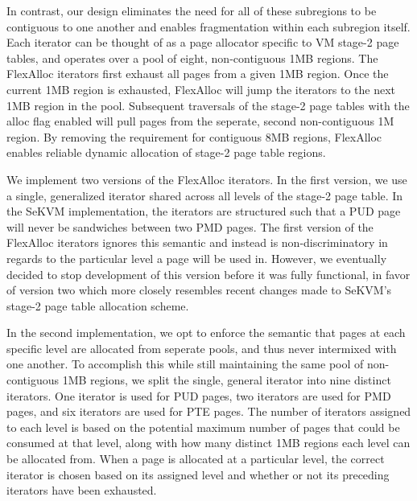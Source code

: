 In contrast, our design eliminates the need for all of these subregions to be contiguous to
one another and enables fragmentation within each subregion itself. Each iterator can be thought of as a page allocator specific to VM stage-2
page tables, and operates over a pool of eight, non-contiguous 1MB regions. The FlexAlloc iterators
first exhaust all pages from a given 1MB region. Once the current 1MB region is exhausted, FlexAlloc
will jump the iterators to the next 1MB region in the pool. Subsequent traversals of the
stage-2 page tables with the alloc flag enabled will pull pages from the seperate, second
non-contiguous 1M region. By removing the requirement for contiguous 8MB regions, FlexAlloc
enables reliable dynamic allocation of stage-2 page table regions.

We implement two versions of the FlexAlloc iterators. In the first version, we use a single,
generalized iterator shared across all levels of the stage-2 page table. In the SeKVM implementation,
the iterators are structured such that a PUD page will never be sandwiches between two PMD pages.
The first version of the FlexAlloc iterators ignores this semantic and instead is non-discriminatory
in regards to the particular level a page will be used in. However, we eventually decided to stop development of this
version before it was fully functional, in favor of version two which more closely resembles recent changes made to SeKVM's
stage-2 page table allocation scheme.

In the second implementation, we opt to enforce the semantic that pages at each specific level are
allocated from seperate pools, and thus never intermixed with one another. To accomplish this while still maintaining the same pool of non-contiguous 1MB regions,
we split the single, general iterator into nine distinct iterators. One iterator is used
for PUD pages, two iterators are used for PMD pages, and six iterators are used for PTE pages.
The number of iterators assigned to each level is based on the potential maximum number of
pages that could be consumed at that level, along with how many distinct 1MB regions each level
can be allocated from. When a page is allocated at a particular level, the correct iterator is chosen based on
its assigned level and whether or not its preceding iterators have been exhausted.

